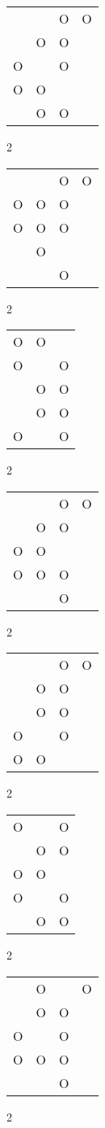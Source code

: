 \begin{tabular}{|m{0.2cm}m{0.2cm}m{0.2cm}m{0.2cm}|}\hline
 & &O&O\\
 &O&O& \\
O& &O& \\
O&O& & \\
 &O&O& \\
\hline\end{tabular}2
\begin{tabular}{|m{0.2cm}m{0.2cm}m{0.2cm}m{0.2cm}|}\hline
 & &O&O\\
O&O&O& \\
O&O&O& \\
 &O& & \\
 & &O& \\
\hline\end{tabular}2
\begin{tabular}{|m{0.2cm}m{0.2cm}m{0.2cm}|}\hline
O&O& \\
O& &O\\
 &O&O\\
 &O&O\\
O& &O\\
\hline\end{tabular}2
\begin{tabular}{|m{0.2cm}m{0.2cm}m{0.2cm}m{0.2cm}|}\hline
 & &O&O\\
 &O&O& \\
O&O& & \\
O&O&O& \\
 & &O& \\
\hline\end{tabular}2
\begin{tabular}{|m{0.2cm}m{0.2cm}m{0.2cm}m{0.2cm}|}\hline
 & &O&O\\
 &O&O& \\
 &O&O& \\
O& &O& \\
O&O& & \\
\hline\end{tabular}2
\begin{tabular}{|m{0.2cm}m{0.2cm}m{0.2cm}|}\hline
O& &O\\
 &O&O\\
O&O& \\
O& &O\\
 &O&O\\
\hline\end{tabular}2
\begin{tabular}{|m{0.2cm}m{0.2cm}m{0.2cm}m{0.2cm}|}\hline
 &O& &O\\
 &O&O& \\
O& &O& \\
O&O&O& \\
 & &O& \\
\hline\end{tabular}2
